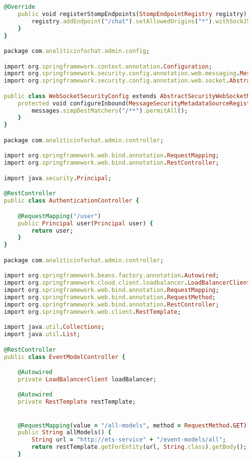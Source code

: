 \begin{lstlisting}[language=Ruby, style=rubystyle]
    @Override
    public void registerStompEndpoints(StompEndpointRegistry registry) {
        registry.addEndpoint("/chat").setAllowedOrigins("*").withSockJS();
    }
}

package com.analiticinfochat.admin.config;

import org.springframework.context.annotation.Configuration;
import org.springframework.security.config.annotation.web.messaging.MessageSecurityMetadataSourceRegistry;
import org.springframework.security.config.annotation.web.socket.AbstractSecurityWebSocketMessageBrokerConfigurer;

public class WebSocketSecurityConfig extends AbstractSecurityWebSocketMessageBrokerConfigurer {
    protected void configureInbound(MessageSecurityMetadataSourceRegistry messages) {
        messages.simpDestMatchers("/**").permitAll();
    }
}

package com.analiticinfochat.admin.controller;

import org.springframework.web.bind.annotation.RequestMapping;
import org.springframework.web.bind.annotation.RestController;

import java.security.Principal;

@RestController
public class AuthenticationController {

    @RequestMapping("/user")
    public Principal user(Principal user) {
        return user;
    }
}

package com.analiticinfochat.admin.controller;

import org.springframework.beans.factory.annotation.Autowired;
import org.springframework.cloud.client.loadbalancer.LoadBalancerClient;
import org.springframework.web.bind.annotation.RequestMapping;
import org.springframework.web.bind.annotation.RequestMethod;
import org.springframework.web.bind.annotation.RestController;
import org.springframework.web.client.RestTemplate;

import java.util.Collections;
import java.util.List;

@RestController
public class EventModelController {

    @Autowired
    private LoadBalancerClient loadBalancer;

    @Autowired
    private RestTemplate restTemplate;


    @RequestMapping(value = "/all-models", method = RequestMethod.GET)
    public String allModels() {
        String url = "http://ets-service" + "/event-models/all";
        return restTemplate.getForEntity(url, String.class).getBody();
    }


\end{lstlisting}
